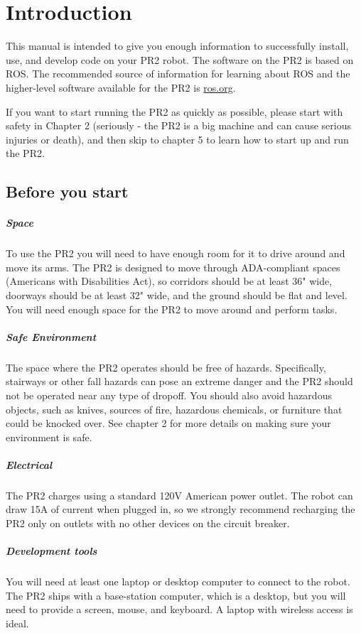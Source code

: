 \chapter {Introduction}
This manual is intended to give you enough information to successfully install, use, and develop code on your PR2 robot.  The software on the PR2 is based on ROS.  The recommended source of information for learning about ROS and the higher-level software available for the PR2 is \href{http://ros.org}{ros.org}.

If you want to start running the PR2 as quickly as possible, please start with safety in Chapter 2 (seriously - the PR2 is a big machine and can cause serious injuries or death), and then skip to chapter 5 to learn how to start up and run the PR2.

\section{Before you start}
\paragraph{Space} To use the PR2 you will need to have enough room for it to drive around and move its arms.  The PR2 is designed to move through ADA-compliant spaces (Americans with Disabilities Act), so corridors should be at least 36" wide, doorways should be at least 32" wide, and the ground should be flat and level.  You will need enough space for the PR2 to move around and perform tasks.
\paragraph{Safe Environment} The space where the PR2 operates should be free of hazards.  Specifically, stairways or other fall hazards can pose an extreme danger and the PR2 should not be operated near any type of dropoff.  You should also avoid hazardous objects, such as knives, sources of fire, hazardous chemicals, or furniture that could be knocked over.  See chapter 2 for more details on making sure your environment is safe.
\paragraph{Electrical} The PR2 charges using a standard 120V American power outlet.  The robot can draw 15A of current when plugged in, so we strongly recommend recharging the PR2 only on outlets with no other devices on the circuit breaker.
\paragraph{Development tools}
You will need at least one laptop or desktop computer to connect to the robot.  The PR2 ships with a base-station computer, which is a desktop, but you will need to provide a screen, mouse, and keyboard.  A laptop with wireless access is ideal.
